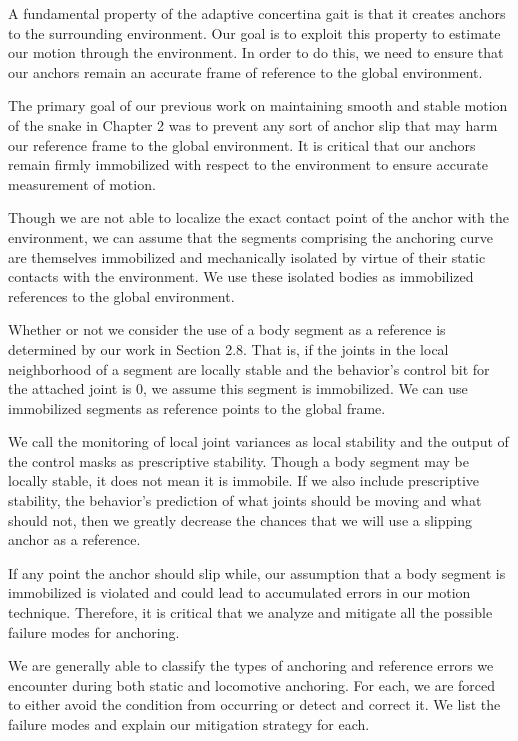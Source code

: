 

A fundamental property of the adaptive concertina gait is that it creates anchors to the surrounding environment. Our goal is to exploit this property to estimate our motion through the environment. In order to do this, we need to ensure that our anchors remain an accurate frame of reference to the global environment.

The primary goal of our previous work on maintaining smooth and stable motion of the snake in Chapter 2 was to prevent any sort of anchor slip that may harm our reference frame to the global environment. It is critical that our anchors remain firmly immobilized with respect to the environment to ensure accurate measurement of motion.

Though we are not able to localize the exact contact point of the anchor with the environment, we can assume that the segments comprising the anchoring curve are themselves immobilized and mechanically isolated by virtue of their static contacts with the environment. We use these isolated bodies as immobilized references to the global environment.

Whether or not we consider the use of a body segment as a reference is determined by our work in Section 2.8. That is, if the joints in the local neighborhood of a segment are locally stable and the behavior's control bit for the attached joint is 0, we assume this segment is immobilized. We can use immobilized segments as reference points to the global frame.

We call the monitoring of local joint variances as local stability and the output of the control masks as prescriptive stability. Though a body segment may be locally stable, it does not mean it is immobile. If we also include prescriptive stability, the behavior's prediction of what joints should be moving and what should not, then we greatly decrease the chances that we will use a slipping anchor as a reference.

If any point the anchor should slip while, our assumption that a body segment is immobilized is violated and could lead to accumulated errors in our motion technique. Therefore, it is critical that we analyze and mitigate all the possible failure modes for anchoring.

We are generally able to classify the types of anchoring and reference errors we encounter during both static and locomotive anchoring. For each, we are forced to either avoid the condition from occurring or detect and correct it. We list the failure modes and explain our mitigation strategy for each.

